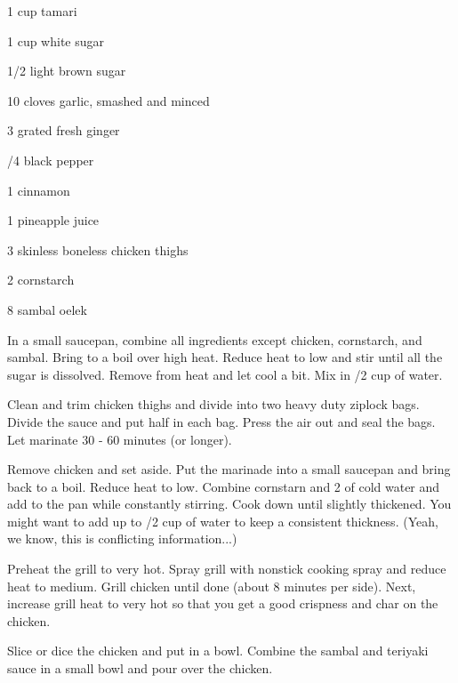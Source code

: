 \begin{IngredientsAndSteps}
    \ListIngredientsAndSteps
    {
        1 cup tamari

        1 cup white sugar

        1/2 \tsp[s] light brown sugar

        10 cloves garlic, smashed and minced

        3 \Tbl[s] grated fresh ginger

        /4 \tsp black pepper

        1 \tsp cinnamon

        1 \Tbl pineapple juice

        3 \Pd[s] skinless boneless chicken thighs

        2 \Tbl[s] cornstarch

        8 \Tbl[s] sambal oelek
    }
    {
        In a small saucepan, combine all ingredients except chicken, cornstarch, and sambal.
        Bring to a boil over high heat. Reduce heat to low and stir until all the sugar is
        dissolved. Remove from heat and let cool a bit. Mix in /2 cup of water.

        Clean and trim chicken thighs and divide into two heavy duty ziplock bags. Divide the
        sauce and put half in each bag. Press the air out and seal the bags. Let marinate 30 - 60
        minutes (or longer).

        Remove chicken and set aside. Put the marinade into a small saucepan and bring back
        to a boil. Reduce heat to low. Combine cornstarn and 2 \Tbl[s] of cold water and
        add to the pan while constantly stirring. Cook down until slightly thickened. You might
        want to add up to /2 cup of water to keep a consistent thickness. (Yeah, we know, this
        is conflicting information...)

        Preheat the grill to very hot. Spray grill with nonstick cooking spray and reduce
        heat to medium. Grill chicken until done (about 8 minutes per side). Next, increase grill
        heat to very hot so that you get a good crispness and char on the chicken.

        Slice or dice the chicken and put in a bowl. Combine the sambal and teriyaki sauce in
        a small bowl and pour over the chicken.
    }

\end{IngredientsAndSteps}

%
%
%
%
\newpage

